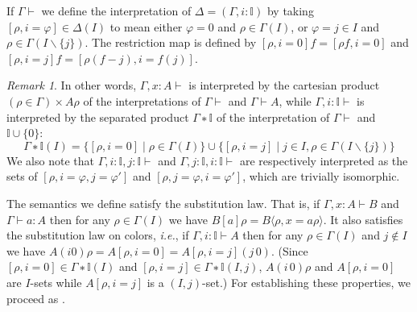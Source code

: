 \documentclass[english]{PaperTools/latex/entcs}
\theoremstyle{plain}
\theoremstyle{definition}
\theoremstyle{remark}
\newtheorem*{remark}{Remark}
\def\ie{\textit{i.e.}}
\begin{document}
If $Γ⊢$ we define the interpretation of $Δ = (Γ,i:𝕀)$ by taking
$[ρ,i=φ] ∈ Δ(I)$ to mean either $φ = 0$ and $ρ ∈ Γ(I)$, or
$φ = j ∈ I$ and $ρ ∈ Γ(I\backslash\{j\})$.
The restriction map is defined by
$[ρ,i=0]f = [ρf,i=0]$ and $[ρ,i=j]f = [ρ(f-j),i=f(j)]$.
\begin{remark}
  In other words,
  $Γ,x:A⊢$ is interpreted by the cartesian product $(ρ∈Γ) × Aρ$ of the
  interpretations of $Γ⊢$ and $Γ⊢A$, while
  $Γ,i:𝕀⊢$ is interpreted by the separated product \cite[sec.~3.4
  p.~54]{PittsAM:nomsns} $Γ ∗ 𝕀$ of the
  interpretation of $Γ⊢$ and $𝕀 ∪ \{0\}$:
  $$Γ ∗ 𝕀(I) = \{ [ρ,i=0] \mid ρ ∈ Γ(I) \} ∪
               \{ [ρ,i=j] \mid j ∈ I, ρ ∈ Γ(I\backslash\{j\}) \}$$
  We also note that $Γ,i:𝕀,j:𝕀 ⊢$ and $Γ,j:𝕀,i:𝕀 ⊢$ are respectively
  interpreted as the sets of $[ρ,i=φ,j=φ']$ and $[ρ,j=φ,i=φ']$, which are
  trivially isomorphic.
\end{remark}

\smallskip
The semantics we define satisfy the substitution law. That is, if $Γ,x:A ⊢ B$
and $Γ ⊢ a:A$ then for any $ρ ∈ Γ(I)$ we have
$B[a]ρ = B⟨ρ,x=aρ⟩$.
It also satisfies the substitution law on colors, \ie, if $Γ,i:𝕀 ⊢ A$
then for any $ρ ∈ Γ(I)$ and $j ∉ I$ we have
$A(i 0)ρ = A[ρ,i=0] = A[ρ,i=j](j\, 0)$.
(Since $[ρ,i=0] ∈ Γ∗𝕀(I)$ and $[ρ,i=j] ∈ Γ∗𝕀(I,j)$, $A(i\, 0)ρ$ and
$A[ρ,i=0]$ are $I$-sets while $A[ρ,i=j]$ is a $(I,j)$-set.)
For establishing these properties, we proceed as \citet{Aczel98onrelating}.
\end{document}
